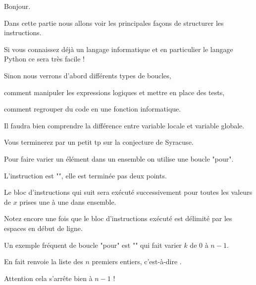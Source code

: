 


\newcommand{\Sage}{\texttt{Sage}}




\debuttexte


\diapo

Bonjour. 

Dans cette partie nous allons voir les principales façons de structurer
les instructions. 

\change

Si vous connaissez déjà un langage informatique et en 
particulier le langage Python ce sera très facile !

\change
Sinon nous verrons d'abord différents types de boucles,

\change
comment manipuler les expressions logiques et mettre en place des tests,

\change
comment regrouper du code en une fonction informatique.

\change
Il faudra bien comprendre la différence entre variable locale
et variable globale.

\change
Vous terminerez par un petit tp sur la conjecture de Syracuse.


\diapo


Pour faire varier un élément dans un ensemble on utilise
une boucle "pour".

L'instruction est "", elle est terminée pas deux points. 

Le bloc d'instructions qui suit sera exécuté successivement 
pour toutes les valeurs de $x$ prises une à une dans ensemble.

Notez encore une fois que le bloc d'instructions exécuté 
est délimité par les espaces en début de ligne.


\diapo

\change

Un exemple fréquent de boucle "pour" 
est "" qui fait varier $k$ de $0$ à $n-1$.

\change
En fait  renvoie 
la liste des $n$ premiers entiers, c'est-à-dire \codeinline{[0,1,2,...,n-1]}.

Attention cela s’arrête bien à $n-1$ !

